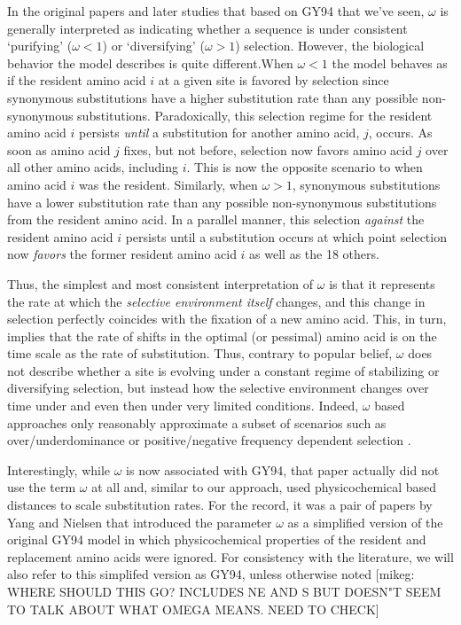 \documentclass[12pt,letterpaper,fleqn]{article}
\newcommand{\PC}{physicochemical\xspace}
\begin{document}
{In the original papers \citep{GoldmanAndYang1994,YangAndNielsen1998,NielsenAndYang1998} and later studies that based on GY94 that we've seen, $\omega$ is generally interpreted as indicating whether a sequence is under consistent `purifying' ($\omega < 1$) or `diversifying' ($\omega > 1$) selection.
However, the biological behavior the model describes is quite different.When $\omega < 1$ the model behaves as if the resident amino acid $i$ at a given site is favored by selection since synonymous substitutions have a higher substitution rate than any possible non-synonymous substitutions.
Paradoxically, this selection regime for the resident amino acid $i$ persists \emph{until} a substitution for another amino acid, $j$, occurs.
As soon as amino acid $j$ fixes, but not before, selection now favors amino acid $j$ over all other amino acids, including $i$.
This is now the opposite scenario to when amino acid $i$ was the resident.
Similarly, when $\omega > 1$, synonymous substitutions have a lower substitution rate than any possible non-synonymous substitutions from the resident amino acid.
In a parallel manner, this selection \emph{against} the resident amino acid $i$ persists until a substitution occurs at which point selection now \emph{favors} the former resident amino acid $i$ as well as the 18 others.

Thus, the simplest and most consistent interpretation of $\omega$ is that it represents the rate at which the \emph{selective environment itself} changes, and this change in selection perfectly coincides with the fixation of a new amino acid.
This, in turn, implies that the rate of shifts in the optimal (or pessimal) amino acid is on the time scale as the rate of substitution.
Thus, contrary to popular belief,  $\omega$ does not describe whether a site is evolving under a constant regime of stabilizing or diversifying selection, but instead how the selective environment changes over time under and even then under very limited conditions.
Indeed, $\omega$ based approaches only reasonably approximate a subset of scenarios such as over/underdominance or positive/negative frequency dependent selection \citep{HughesAndNei1988,Nowak2006}.

Interestingly, while $\omega$ is now associated with GY94, that paper actually did not use the term $\omega$ at all and, similar to our approach, used \PC based distances to scale substitution rates.
For the record, it was a pair of papers by Yang and Nielsen \citep{NielsenAndYang1998,YangAndNielsen1998} that introduced the parameter $\omega$ as a simplified version of the original GY94 model in which \PC properties of the resident and replacement amino acids were ignored.
For consistency with the literature, we will also refer to this simplifed version as GY94, unless otherwise noted
[mikeg: WHERE SHOULD THIS GO? \citet{NielsenAndYang2003} INCLUDES NE AND S BUT DOESN"T SEEM TO TALK ABOUT WHAT OMEGA MEANS.
NEED TO CHECK]

}
\end{document}
